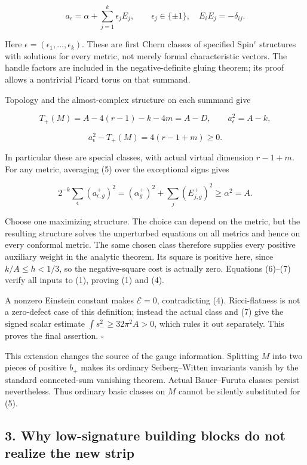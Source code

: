 \documentclass[
  10pt,
]{article}
\begin{document}
\[
 a_{\epsilon}=\alpha+\sum_{j=1}^k\epsilon_jE_j,
 \qquad \epsilon_j\in\{\pm1\},\quad E_iE_j=-\delta_{ij}.
 \tag{5}
\]

Here \(\epsilon=(\epsilon_1,\ldots,\epsilon_k)\). These are first Chern
classes of specified Spin\(^c\) structures with solutions for every
metric, not merely formal characteristic vectors. The handle factors are
included in the negative-definite gluing theorem; its proof allows a
nontrivial Picard torus on that summand.

Topology and the almost-complex structure on each summand give

\[
 T_+(M)=A-4(r-1)-k-4m=A-D,
 \qquad a_{\epsilon}^2=A-k,
\]

\[
 a_{\epsilon}^2-T_+(M)=4(r-1+m)\ge0.
 \tag{6}
\]

In particular these are special classes, with actual virtual dimension
\(r-1+m\). For any metric, averaging (5) over the exceptional signs
gives

\[
 2^{-k}\sum_{\epsilon}(a_{\epsilon,g}^+)^2
   =(\alpha_g^+)^2+\sum_j(E_{j,g}^+)^2
   \ge\alpha^2=A.
 \tag{7}
\]

Choose one maximizing structure. The choice can depend on the metric,
but the resulting structure solves the unperturbed equations on all
metrics and hence on every conformal metric. The same chosen class
therefore supplies every positive auxiliary weight in the analytic
theorem. Its square is positive here, since \(k/A\le h<1/3\), so the
negative-square cost is actually zero. Equations (6)--(7) verify all
inputs to (1), proving (1) and (4).

A nonzero Einstein constant makes \(\mathcal E=0\), contradicting (4).
Ricci-flatness is not a zero-defect case of this definition; instead the
actual class and (7) give the signed scalar estimate
\(\int s_-^2\ge32\pi^2A>0\), which rules it out separately. This proves
the final assertion. \(\square\)

This extension changes the source of the gauge information. Splitting
\(M\) into two pieces of positive \(b_+\) makes its ordinary
Seiberg--Witten invariants vanish by the standard connected-sum
vanishing theorem. Actual Bauer--Furuta classes persist nevertheless.
Thus ordinary basic classes on \(M\) cannot be silently substituted for
(5).

\hypertarget{why-low-signature-building-blocks-do-not-realize-the-new-strip}{%
\subsection{3. Why low-signature building blocks do not realize the new
strip}\label{why-low-signature-building-blocks-do-not-realize-the-new-strip}}
\end{document}

